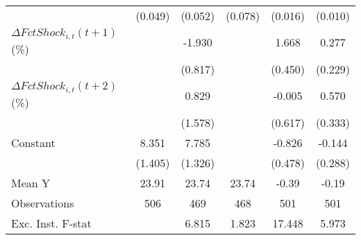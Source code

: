 {\begin{tabular}{l*{5}{c}}
                    &     (0.049)         &     (0.052)         &     (0.078)         &     (0.016)         &     (0.010)         \\
\addlinespace
$ \Delta FctShock_{i,t}(t+1)$ (\%)&                     &      -1.930\sym{**} &                     &       1.668\sym{***}&       0.277         \\
                    &                     &     (0.817)         &                     &     (0.450)         &     (0.229)         \\
\addlinespace
$ \Delta FctShock_{i,t}(t+2)$ (\%)&                     &       0.829         &                     &      -0.005         &       0.570\sym{*}  \\
                    &                     &     (1.578)         &                     &     (0.617)         &     (0.333)         \\
\addlinespace
Constant            &       8.351\sym{***}&       7.785\sym{***}&                     &      -0.826\sym{*}  &      -0.144         \\
                    &     (1.405)         &     (1.326)         &                     &     (0.478)         &     (0.288)         \\
\midrule
Mean Y              &       23.91         &       23.74         &       23.74         &       -0.39         &       -0.19         \\
Observations        &         506         &         469         &         468         &         501         &         501         \\
Exc. Inst. F-stat   &                     &       6.815         &       1.823         &      17.448         &       5.973         \\
\bottomrule
\end{tabular}
}
